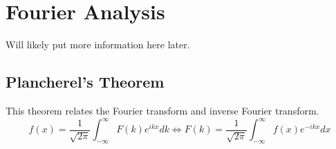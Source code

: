 




\section{Fourier Analysis}
Will likely put more information here later.

\subsection{Plancherel's Theorem}
This theorem relates the Fourier transform and inverse Fourier transform.
\begin{equation}\label{eq:plancherels}
    f(x) = \frac{1}{\sqrt{2\pi}}\int_{-\infty}^\infty F(k)e^{ikx}dk \iff F(k) = \frac{1}{\sqrt{2\pi}}\int_{-\infty}^\infty f(x)e^{-ikx}dx
\end{equation}
